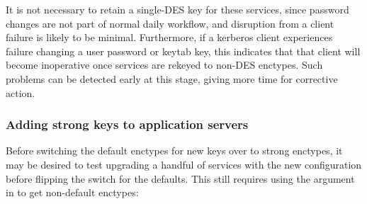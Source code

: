 \documentclass[letterpaper,10pt,english]{sphinxmanual}
\begin{document}
%
\begin{sphinxVerbatim}[commandchars=\\\{\}]
\PYG{p}{[} \PYG{p}{]}
 
\PYG{p}{[} \PYG{p}{]}
 
     
   
\PYG{p}{[} \PYG{p}{]}
 
     
   
\end{sphinxVerbatim}

It is not necessary to retain a single-DES key for these services, since
password changes are not part of normal daily workflow, and disruption
from a client failure is likely to be minimal.  Furthermore, if a kerberos
client experiences failure changing a user password or keytab key,
this indicates that that client will become inoperative once services
are rekeyed to non-DES enctypes.  Such problems can be detected early
at this stage, giving more time for corrective action.


\subsubsection{Adding strong keys to application servers}
\label{\detokenize{admin/advanced/retiring-des:adding-strong-keys-to-application-servers}}
Before switching the default enctypes for new keys over to strong enctypes,
it may be desired to test upgrading a handful of services with the
new configuration before flipping the switch for the defaults.  This
still requires using the  argument in {\hyperref[\detokenize{admin/admin_commands/kadmin_local:kadmin-1}]{}} to get non-default
enctypes:
\end{document}
